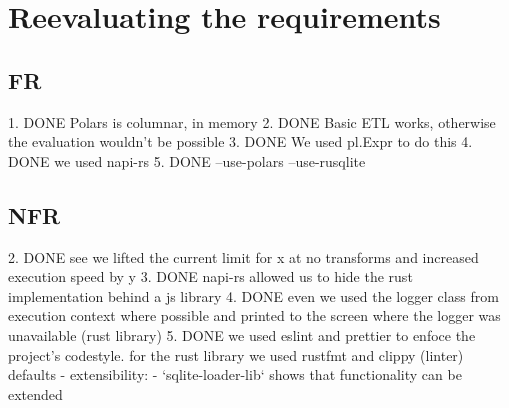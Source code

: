 \section{Reevaluating the requirements}
\subsection{FR}
1. DONE Polars is columnar, in memory
2. DONE Basic ETL works, otherwise the evaluation wouldn't be possible
3. DONE We used pl.Expr to do this
4. DONE we used napi-rs
5. DONE --use-polars --use-rusqlite
\subsection{NFR}
2. DONE see we lifted the current limit for x at no transforms and increased execution speed by y
3. DONE napi-rs allowed us to hide the rust implementation behind a js library
4. DONE even we used the logger class from execution context where possible and printed to the screen where the logger was unavailable (rust library)
5. DONE we used eslint and prettier to enfoce the project's codestyle. for the rust library we used rustfmt and clippy (linter) defaults
- extensibility:
- `sqlite-loader-lib` shows that functionality can be extended
